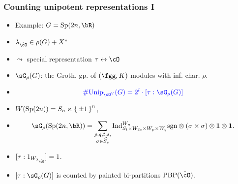 \documentclass[t,mathserif,11pt,usenames,dvipsnames]{beamer}
\theoremstyle{plain}
\theoremstyle{definition}
\newcommand{\bfone}{\mathbf{1}}
\def\sgn{{\rm sgn}}
\def\Ind{{\rm Ind}}
\def\Sp{{\mathrm{Sp}}}
\def\Unip{{\mathrm{Unip}}}
\def\ckcO{{\check{\cO}}}
\def\Nil{\mathrm{Nil}}
\def\lblue{\color{blue}}
\def\vcO{\cO^\vee}
\def\PBP{\mathrm{PBP}}
\def\LS{\mathrm{LS}}
\def\AOD{\mathrm{AOD}}
\begin{document}
    
    \begin{frame}[label=CT]
        \frametitle{Counting unipotent representations I}
        \begin{itemize}[<+->]
            \item Example: $G = \Sp(2n,\bR)$
            \item  $\lambda_{\ckcO}\in \rho(G) + X^*$ %
            \item[] $\leadsto$ special representation $\tau \leftrightarrow \cO$ 
            \item $\sG_{\rho}(G)$:  the Groth. gp. of $(\fgg,K)$-modules with inf. char. $\rho$. 
            \item[]
            \vspace{-1em}
            \[
            \lblue
            \#\Unip_{\vcO}(G) = 2^l \cdot [\tau:\sG_{\rho}(G)] 
            \]
            \vspace{-1em}
            \item[] $W(\Sp(2n)) = S_n \ltimes \set{\pm 1}^n$, 
            \vspace{-1em}
            \item[] 
            \[
            \sG_{\rho}(\Sp(2n,\bR)) = \sum_{\substack{p,q,t,s,\\
            \sigma\in \widehat{S_s}}} \Ind_{S_t\times W_{2s}\times W_p\times
            W_q}^{W_n} \sgn\otimes(\sigma\times \sigma)\otimes \bfone\otimes \bfone .
            \]
            \item $[\tau:1_{W_{\lambda_{\ckcO}}}]=1$. %
            \item $[\tau:\sG_{\rho}(G)]$ is counted by painted bi-partitions $\PBP(\ckcO)$.
        \end{itemize}
    \end{frame}
\end{document}
